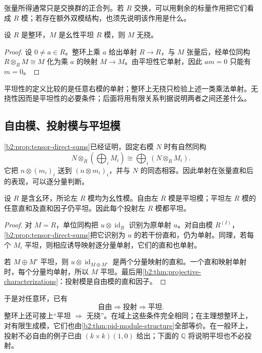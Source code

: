张量所得通常只是交换群的正合列。若 \(R\) 交换，可以用剩余的标量作用把它们看成 \(R\) 模；若存在额外双模结构，也须先说明该作用是什么。

\begin{proposition}\label{b2:prop:flat-torsionfree}
	设 \(R\) 是整环，\(M\) 是幺性平坦 \(R\) 模，则 \(M\) 无挠。
\end{proposition}
\begin{proof}
	设 \(0\ne a\in R\)。整环上乘 \(a\) 给出单射 \(R\to R\)，与 \(M\) 张量后，经单位同构 \(R\otimes_R M\cong M\) 化为乘 \(a\) 的映射 \(M\to M\)。由平坦性它单射，因此 \(am=0\) 只能有 \(m=0\)。
\end{proof}

平坦性的定义比较的是任意右模的单射；整环上无挠只检验上述一类乘法单射。无挠性因而是平坦性的必要条件；后面将用有限关系判据说明两者之间还差什么。

\subsection{自由模、投射模与平坦模}
\label{b2:subsec:0703:02}

\cref{b2:prop:tensor-direct-sums}已经证明，固定右模 \(N\) 时有自然同构
\[
	N\otimes_R\left(\bigoplus_iM_i\right) \cong\bigoplus_i(N\otimes_R M_i).
\]
它把 \(n\otimes(m_i)_i\) 送到 \((n\otimes m_i)_i\)，并与 \(N\) 的同态相容。因此单射在张量直和后的表现，可以逐分量判断。

\begin{theorem}\label{b2:thm:projective-flat}
	设 \(R\) 是含幺环，所论左 \(R\) 模均为幺性模。自由左 \(R\) 模是平坦模；平坦左 \(R\) 模的任意直和及直和因子仍平坦。因此每个投射左 \(R\) 模都平坦。
\end{theorem}
\begin{proof}
	对 \(M=R\)，单位同构把 \(u\otimes\operatorname{id}_R\) 识别为原单射 \(u\)。对自由模 \(R^{(I)}\)，\cref{b2:prop:tensor-direct-sums}把它识别为 \(u\) 的若干份直和，仍为单射。同理，若每个 \(M_i\) 平坦，则相应诱导映射逐分量单射，它们的直和也单射。

	若 \(M\oplus M'\) 平坦，则 \(u\otimes\operatorname{id}_{M\oplus M'}\) 是两个分量映射的直和。一个直和映射单射时，每个分量均单射，所以 \(M\) 平坦。最后用\cref{b2:thm:projective-characterizations}：投射模是自由模的直和因子。
\end{proof}

于是对任意环，已有
\[
	\text{自由}\Longrightarrow\text{投射}\Longrightarrow\text{平坦}.
\]
整环上还可接上“平坦 \(\Longrightarrow\) 无挠”。在域上这些条件完全相同；在主理想整环上，对有限生成模，它们也由\cref{b2:thm:pid-module-structure}全部等价。在一般环上，投射不必自由的例子已由 \((k\times k)(1,0)\) 给出；下面的 \(\mathbb Q\) 将说明平坦也不必投射。

